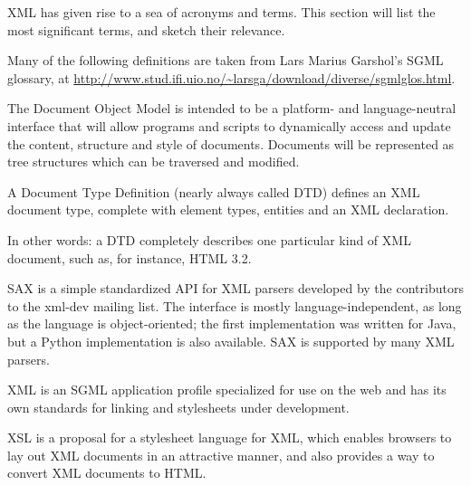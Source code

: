 \documentclass{howto}
\begin{document}
XML has given rise to a sea of acronyms and terms.  This section will
list the most significant terms, and sketch their relevance.

Many of the following definitions are taken from Lars Marius Garshol's
SGML glossary, at \url{http://www.stud.ifi.uio.no/\~larsga/download/diverse/sgmlglos.html}.

\begin{definitions}
%
The Document Object Model is intended to be a platform- and
language-neutral interface that will allow programs and scripts to
dynamically access and update the content, structure and style of
documents. Documents will be represented as tree structures which can
be traversed and modified.

%
A Document Type Definition (nearly always called DTD) defines
an XML document type, complete with element types, entities
and an XML declaration.
       
In other words: a DTD completely describes one particular kind
of XML document, such as, for instance, HTML 3.2.
        
%
SAX is a simple standardized API for XML parsers developed by the
contributors to the xml-dev mailing list. The interface is mostly
language-independent, as long as the language is object-oriented; the
first implementation was written for Java, but a Python implementation
is also available.  SAX is supported by many XML parsers.
          
%
XML is an SGML application profile specialized for use on the
web and has its own standards for linking and stylesheets under development.
          

%
XSL is a proposal for a stylesheet language for XML, which
enables browsers to lay out XML documents in an attractive
manner, and also provides a way to convert XML documents to
HTML.
\end{definitions}
          
%
\end{document}

